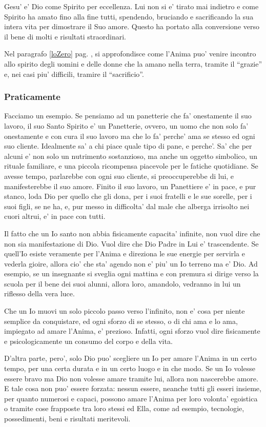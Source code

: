 Gesu' e' Dio come Spirito per eccellenza. Lui non si e' tirato mai indietro e come Spirito ha amato fino alla fine tutti, spendendo, bruciando e sacrificando la sua intera vita per dimostrare il Suo amore. Questo ha portato alla conversione verso il bene di molti e risultati straordinari.

 Nel paragrafo \ref{loZero} pag. \pageref{loZero}, si approfondisce come l'Anima puo' venire incontro allo spirito degli uomini e delle donne che la amano nella terra, tramite il ``grazie'' e, nei casi piu' difficili, tramire il ``sacrificio''. 

\subsubsection{Praticamente}
Facciamo un esempio. Se pensiamo ad un panetterie che fa' onestamente il suo lavoro, il suo Santo Spirito e' un Panetterie, ovvero, un uomo che non solo fa' onestamente e con cura il suo lavoro ma che lo fa' perche' ama se stesso ed ogni suo cliente. Idealmente sa' a chi piace quale tipo di pane, e perche'. Sa' che per alcuni e' non solo un nutrimento sostanzioso, ma anche un oggetto simbolico, un rituale familiare, e una piccola ricompensa piacevole per le fatiche quotidiane. Se avesse tempo, parlarebbe con ogni suo cliente, si preoccuperebbe di lui, e manifesterebbe il suo amore. Finito il suo lavoro, un Panettiere e' in pace, e pur stanco, loda Dio per quello che gli dona, per i suoi fratelli e le sue sorelle, per i suoi figli, se ne ha, e, pur messo in difficolta' dal male che alberga irrisolto nei cuori altrui, e' in pace con tutti. 

Il fatto che un Io santo non abbia fisicamente capacita' infinite, non vuol dire che non sia manifestazione di Dio. Vuol dire che Dio Padre in Lui e' trascendente. Se quell'Io esiste veramente per l'Anima e direziona le sue energie per servirla e vederla gioire, allora cio' che sta' agendo non e' piu' un Io terreno ma e' Dio.
Ad esempio, se un insegnante si sveglia ogni mattina e con premura si dirige verso la scuola per il bene dei suoi alunni, allora loro, amandolo, vedranno in lui un riflesso della vera luce.

Che un Io muovi un solo piccolo passo verso l'infinito, non e' cosa per niente semplice da conquistare, ed ogni sforzo di se stesso, o di chi ama e lo ama, impiegato ad amare l'Anima, e' prezioso. Infatti, ogni sforzo vuol dire fisicamente e psicologicamente un consumo del corpo e della vita.

D'altra parte, pero', solo Dio puo' scegliere un Io per amare l'Anima in un certo tempo, per una certa durata e in un certo luogo e in che modo. Se un Io volesse essere bravo ma Dio non volesse amare tramite lui, allora non nascerebbe amore. E tale cosa non puo' essere forzata: nessun essere, neanche tutti gli esseri insieme, per quanto numerosi e capaci, possono amare l'Anima per loro volonta' egoistica o tramite cose frapposte tra loro stessi ed Ella, come ad esempio, tecnologie, possedimenti, beni e risultati meritevoli. 

